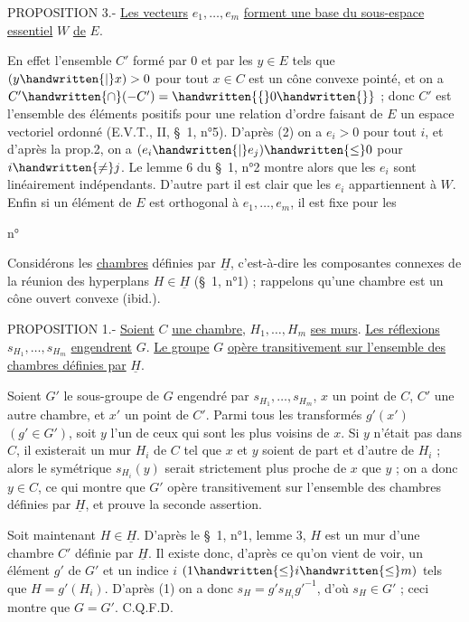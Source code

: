 PROPOSITION 3.- \uline{Les vecteurs} $e_1,\ldots,e_m$ \uline{forment une base du sous-espace essentiel} $W$ \uline{de} $E$.

En effet l'ensemble $C'$ formé par $0$ et par les $y\in E$ tels que $(y\handwritten{|}x)>0$ pour tout $x\in C$ est un cône convexe pointé, et on a $C'\handwritten{\cap}(-C')=\handwritten{\{}0\handwritten{\}}$ ; donc $C'$ est l'ensemble des éléments positifs pour une relation d'ordre faisant de $E$ un espace vectoriel ordonné (E.V.T., II, \S\ 1, n°5). D'après (2) on a $e_i>0$ pour tout $i$, et d'après la prop.2, on a $(e_i\handwritten{|}e_j)\handwritten{\leq}0$ pour $i\handwritten{\ne}j$. Le lemme 6 du \S\ 1, n°2 montre alors que les $e_i$ sont linéairement indépendants. D'autre part il est clair que les $e_i$ appartiennent à $W$. Enfin si un élément de $E$ est orthogonal à $e_1,\ldots,e_m$, il est fixe pour les

\begin{flushright}n°\end{flushright}
Considérons les \uline{chambres} définies par $\underline{H}$, c'est-à-dire les composantes connexes de la réunion des hyperplans $H\in\underline{H}$ (\S\ 1, n°1) ; rappelons qu'une chambre est un cône ouvert convexe (ibid.).

PROPOSITION 1.- \uline{Soient} $C$ \uline{une chambre}, $H_1,\ldots,H_m$ \uline{ses murs}. \uline{Les réflexions} $s_{H_1},\ldots,s_{H_m}$ \uline{engendrent} $G$. \uline{Le groupe} $G$ \uline{opère transitivement sur l'ensemble des chambres définies par} $\underline{H}$.

Soient $G'$ le sous-groupe de $G$ engendré par $s_{H_1},\ldots,s_{H_m}$, $x$ un point de $C$, $C'$ une autre chambre, et $x'$ un point de $C'$. Parmi tous les transformés $g'(x')$ $(g'\in G')$, soit $y$ l'un de ceux qui sont les plus voisins de $x$. Si $y$ n'était pas dans $C$, il existerait un mur $H_i$ de $C$ tel que $x$ et $y$ soient de part et d'autre de $H_i$ ; alors le symétrique $s_{H_i}(y)$ serait strictement plus proche de $x$ que $y$ ; on a donc $y\in C$, ce qui montre que $G'$ opère transitivement sur l'ensemble des chambres définies par $\underline{H}$, et prouve la seconde assertion.

Soit maintenant $H\in\underline{H}$. D'après le \S\ 1, n°1, lemme 3, $H$ est un mur d'une chambre $C'$ définie par $\underline{H}$. Il existe donc, d'après ce qu'on vient de voir, un élément $g'$ de $G'$ et un indice $i$ $(1\handwritten{\leq}i\handwritten{\leq}m)$ tels que $H=g'(H_i)$. D'après (1) on a donc $s_H=g's_{H_i}{g'}^{-1}$, d'où $s_H\in G'$ ; ceci montre que $G=G'$. C.Q.F.D.

